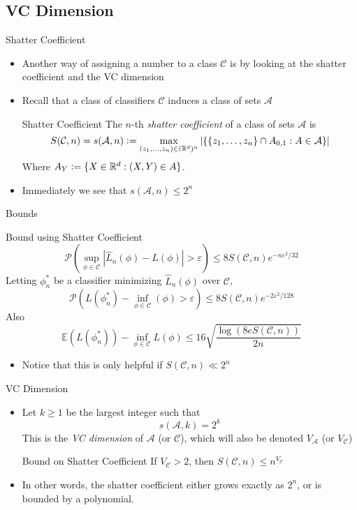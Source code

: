 \documentclass{beamer}
\renewcommand{\Pr}[1]{\mathcal{P} \left( #1 \right)}
\newcommand{\cls}{\mathcal{C}}
\newcommand{\E}[1]{\mathbb{E}\left( #1 \right)}
\newcommand{\R}{\mathbb{R}}
\newcommand{\defeq}{\vcentcolon=}
\newcommand{\abs}[1]{\left| #1 \right|}
\newcommand{\br}[1]{\left\{ #1 \right\} }
\newcommand{\eps}{\varepsilon}
\begin{document}
\subsection{VC Dimension}
\begin{frame}{Shatter Coefficient}
\begin{itemize}
\item Another way of assigning a number to a class $\cls$ is by looking at the shatter coefficient and the VC dimension
\item Recall that a class of classifiers $\cls$ induces a class of sets $\mathcal A$
\begin{block}{Shatter Coefficient}
The $n$-th \emph{shatter coefficient} of a class of sets $\mathcal{A}$ is
\[ S(\cls, n) = s(\mathcal A, n) \defeq \max_{(z_1,\ldots,z_n)\in (\R^d)^n} \abs{ \br{ \br{z_1, \ldots, z_n} \cap A_{0,1} : A \in \mathcal A}} \]
Where $A_Y \defeq \{X \in \R^d : (X,Y) \in A\}$.
\end{block}
\item Immediately we see that $s(\mathcal A, n) \leq 2^n$
\end{itemize}
\end{frame}


\begin{frame}{Bounds}
\begin{block}{Bound using Shatter Coefficient}
\[ \Pr{ \sup_{\phi \in \cls} \abs{ \hat{L}_n (\phi) - L(\phi)} > \eps } \leq 8 S(\cls, n) e^{-n\eps^2/32} \]
Letting $\phi_n^*$ be a classifier minimizing $\hat{L}_n(\phi)$ over $\cls$,
\[ \Pr{ L(\phi^*_n) - \inf_{\phi \in \cls} (\phi) > \eps } \leq 8 S(\cls,n)e^{-2\eps^2/128} \]
Also
\[ \E{L(\phi^*_n)} - \inf_{\phi\in\cls} L(\phi) \leq 16 \sqrt{\frac{\log(8eS(\cls, n))}{2n}} \]
\end{block}
\begin{itemize}
\item Notice that this is only helpful if $S(\cls,n) \ll 2^n$
\end{itemize}
\end{frame}

\begin{frame}{VC Dimension}
\begin{itemize}
\item Let $k \geq 1$ be the largest integer such that
\[ s(\mathcal A, k) = 2^k \]
This is the \emph{VC dimension} of $\mathcal A$ (or $\cls$), which will also be denoted $V_{\mathcal A}$ (or $V_\cls$)
\begin{block}{Bound on Shatter Coefficient}
If $V_\cls > 2$, then $S(\cls, n) \leq n^{V_\cls}$
\end{block}
\item In other words, the shatter coefficient either grows exactly as $2^n$, or is bounded by a polynomial.
\end{itemize}
\end{frame}
\end{document}
